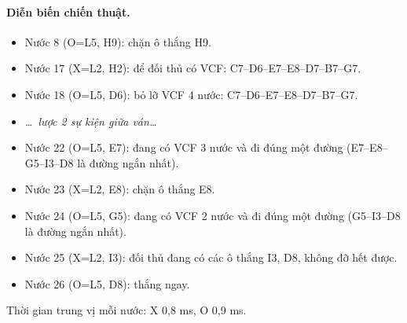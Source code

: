 \paragraph{Diễn biến chiến thuật.}
\begin{itemize}\footnotesize\linespread{1.1}\selectfont
\setlength{\itemsep}{0pt}
  \item Nước 8 (O=L5, H9): chặn ô thắng H9.
  \item Nước 17 (X=L2, H2): để đối thủ có VCF: C7--D6--E7--E8--D7--B7--G7.
  \item Nước 18 (O=L5, D6): bỏ lỡ VCF 4 nước: C7--D6--E7--E8--D7--B7--G7.
  \item[] \emph{\dots\ lược 2 sự kiện giữa ván\dots}
  \item Nước 22 (O=L5, E7): đang có VCF 3 nước và đi đúng một đường (E7--E8--G5--I3--D8 là đường ngắn nhất).
  \item Nước 23 (X=L2, E8): chặn ô thắng E8.
  \item Nước 24 (O=L5, G5): đang có VCF 2 nước và đi đúng một đường (G5--I3--D8 là đường ngắn nhất).
  \item Nước 25 (X=L2, I3): đối thủ đang có các ô thắng I3, D8, không đỡ hết được.
  \item Nước 26 (O=L5, D8): thắng ngay.
\end{itemize}
Thời gian trung vị mỗi nước: X 0,8 ms, O 0,9 ms.
\clearpage

